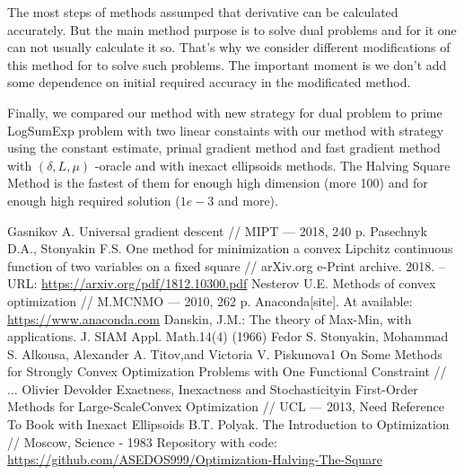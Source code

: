 \documentclass[12pt]{article}
\begin{document}
The most steps of methods assumped that derivative can be calculated accurately. But the main method purpose is to solve dual problems and for it one can not usually calculate it so. That's why we consider different modifications of this method for to solve such problems. The important moment is we don't add some dependence on initial required accuracy in the modificated method.

Finally, we compared our method with new strategy for dual problem to prime LogSumExp problem with two linear constaints with our method with strategy using the constant estimate, primal gradient method and fast gradient method with $(\delta, L, \mu)$ -oracle and with inexact ellipsoids methods. The Halving Square Method is the fastest of them for enough high dimension (more 100) and for enough high required solution ($1e-3$ and more).

\newpage
\begin{thebibliography}{3}
Gasnikov A.  Universal gradient descent // MIPT --- 2018, 240 p.
Pasechnyk D.A., Stonyakin F.S.  One method for minimization a convex Lipchitz continuous function of two variables on a fixed square // arXiv.org e-Print archive. 2018. – URL: \href{https://arxiv.org/pdf/1812.10300.pdf}{https://arxiv.org/pdf/1812.10300.pdf}
Nesterov U.E.  Methods of convex optimization // M.MCNMO --- 2010, 262 p.
Anaconda[site]. At available: \href{https://www.anaconda.com}{https://www.anaconda.com}
Danskin, J.M.: The theory of Max-Min, with applications. J. SIAM Appl. Math.14(4) (1966)
Fedor S. Stonyakin, Mohammad S. Alkousa, Alexander A. Titov,and Victoria V. Piskunova1 On Some Methods for Strongly Convex Optimization Problems with One Functional Constraint // ...
Olivier Devolder Exactness, Inexactness and Stochasticityin First-Order Methods for Large-ScaleConvex Optimization // UCL --- 2013,
Need Reference To Book with Inexact Ellipsoids
B.T. Polyak. The Introduction to Optimization // Moscow, Science - 1983
Repository with code: \href{https://github.com/ASEDOS999/Optimization-Halving-The-Square}{https://github.com/ASEDOS999/Optimization-Halving-The-Square}
\end{thebibliography}
\end{document}

